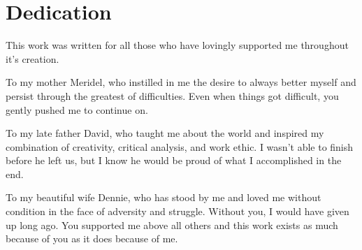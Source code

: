\onehalfspacing
\chapter*{Dedication}
	This work was written for all those who have lovingly supported me throughout it's creation.

	To my mother Meridel, who instilled in me the desire to always better myself and persist through the greatest of difficulties. Even when things got difficult, you gently pushed me to continue on.

	To my late father David, who taught me about the world and inspired my combination of creativity, critical analysis, and work ethic. I wasn't able to finish before he left us, but I know he would be proud of what I accomplished in the end.

	To my beautiful wife Dennie, who has stood by me and loved me without condition in the face of adversity and struggle. Without you, I would have given up long ago. You supported me above all others and this work exists as much because of you as it does because of me.